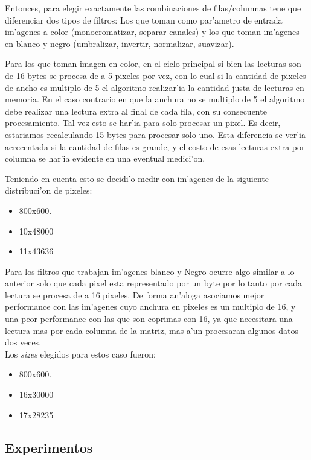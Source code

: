 Entonces, para elegir exactamente las combinaciones de filas/columnas tene que diferenciar dos tipos de
filtros: Los que toman como par'ametro de entrada im'agenes a color (monocromatizar, separar canales) y los que toman im'agenes en blanco y negro
(umbralizar, invertir, normalizar, suavizar).

Para los que toman imagen en color, en el ciclo principal si bien las lecturas son de 16 bytes se procesa de a 5 pixeles por vez, con lo cual si la cantidad de pixeles de ancho es multiplo de 5 el algoritmo realizar'ia la cantidad justa de lecturas en memoria. En el caso contrario en que la anchura no se multiplo de 5 el algoritmo debe realizar una lectura extra al final de cada fila, con su consecuente procesamiento. Tal vez esto se har'ia para solo procesar un pixel. Es decir, estariamos recalculando 15 bytes para procesar solo uno. Esta diferencia se ver'ia acrecentada si la cantidad de filas es grande, y el costo de esas lecturas extra por columna se har'ia evidente en una eventual medici'on.


Teniendo en cuenta esto se decidi'o medir con im'agenes de la siguiente distribuci'on de pixeles:
 \begin{itemize}
 \item{800x600}.
 \item{10x48000}
 \item{11x43636}
\end{itemize}
Para los filtros que trabajan im'agenes blanco y Negro ocurre algo similar a lo anterior solo que cada
pixel esta representado por un byte por lo tanto por cada lectura se procesa de a 16 pixeles. De forma
an'aloga asociamos mejor performance con las im'agenes cuyo anchura en pixeles es un multiplo de 16, y 
una peor performance con las que son coprimas con 16, ya que necesitara una lectura mas por cada columna
de la matriz, mas a'un procesaran algunos datos dos veces. \\
Los \textit{sizes} elegidos para estos caso fueron:\\
\begin{itemize}
 \item{800x600}.
 \item{16x30000}
 \item{17x28235}
\end{itemize}


\subsection{Experimentos}
